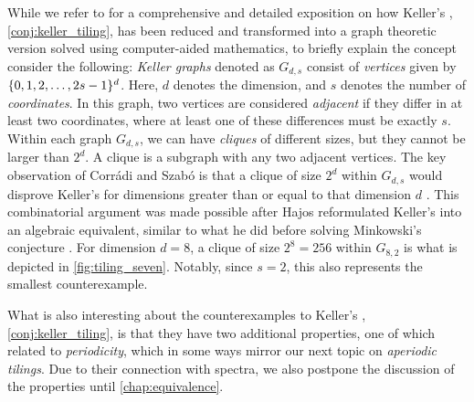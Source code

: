 \documentclass[../thesis.tex]{subfiles}
\begin{document}
While we refer to \cite{brakensiekResolutionKellerConjecture2020} for a comprehensive and detailed exposition on how Keller's , \cref{conj:keller_tiling}, has been reduced and transformed into a graph theoretic version solved using computer-aided mathematics, to briefly explain the concept consider the following: \emph{Keller graphs} denoted as $G_{d,s}$ consist of \emph{vertices} given by $\{0,1,2,\dots,2s-1\}^d$. Here, $d$ denotes the dimension, and $s$ denotes the number of \emph{coordinates}. In this graph, two vertices are considered \emph{adjacent} if they differ in at least two coordinates, where at least one of these differences must be exactly $s$. Within each graph $G_{d,s}$, we can have \emph{cliques} of different sizes, but they cannot be larger than $2^d$. A clique is a subgraph with any two adjacent vertices. The key observation of Corr{\'a}di and Szab{\'o} is that a clique of size $2^d$ within $G_{d,s}$ would disprove Keller's  for dimensions greater than or equal to that dimension $d$ \cite{corradiCombinatorialApproachKeller1990}. This combinatorial argument was made possible after Hajos reformulated Keller's  into an algebraic equivalent, similar to what he did before solving Minkowski's conjecture \cite{lagariasKellerCubetilingConjecture1992,hajosUeberEinfacheUnd1942}. For dimension $d=8$, a clique of size $2^8=256$ within $G_{8,2}$ is what is depicted in \cref{fig:tiling_seven}. Notably, since $s=2$, this also represents the smallest counterexample. %

What is also interesting about the counterexamples to Keller's , \cref{conj:keller_tiling}, is that they have two additional properties, one of which related to \emph{periodicity}, which in some ways mirror our next topic on \emph{aperiodic tilings}. Due to their connection with spectra, we also postpone the discussion of the properties until \cref{chap:equivalence}.


\end{document}
